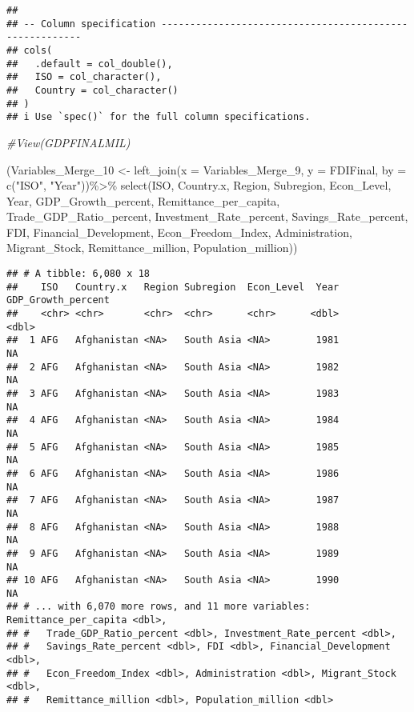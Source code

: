 \documentclass[
]{article}
\newenvironment{Shaded}{\begin{snugshade}}{\end{snugshade}}
\newcommand{\AttributeTok}[1]{\textcolor[rgb]{0.77,0.63,0.00}{#1}}
\newcommand{\CommentTok}[1]{\textcolor[rgb]{0.56,0.35,0.01}{\textit{#1}}}
\newcommand{\FunctionTok}[1]{\textcolor[rgb]{0.00,0.00,0.00}{#1}}
\newcommand{\NormalTok}[1]{#1}
\newcommand{\OtherTok}[1]{\textcolor[rgb]{0.56,0.35,0.01}{#1}}
\newcommand{\SpecialCharTok}[1]{\textcolor[rgb]{0.00,0.00,0.00}{#1}}
\newcommand{\StringTok}[1]{\textcolor[rgb]{0.31,0.60,0.02}{#1}}
\begin{document}
\begin{verbatim}
## 
## -- Column specification --------------------------------------------------------
## cols(
##   .default = col_double(),
##   ISO = col_character(),
##   Country = col_character()
## )
## i Use `spec()` for the full column specifications.
\end{verbatim}

\begin{Shaded}
\begin{Highlighting}[]
\CommentTok{\#View(GDPFINALMIL)}

\NormalTok{(Variables\_Merge\_10 }\OtherTok{\textless{}{-}} \FunctionTok{left\_join}\NormalTok{(}\AttributeTok{x =}\NormalTok{ Variables\_Merge\_9, }\AttributeTok{y =}\NormalTok{ FDIFinal, }\AttributeTok{by =} \FunctionTok{c}\NormalTok{(}\StringTok{"ISO"}\NormalTok{, }\StringTok{"Year"}\NormalTok{))}\SpecialCharTok{\%\textgreater{}\%}
  \FunctionTok{select}\NormalTok{(ISO, Country.x, Region, Subregion, Econ\_Level, Year, GDP\_Growth\_percent, Remittance\_per\_capita, Trade\_GDP\_Ratio\_percent, Investment\_Rate\_percent, Savings\_Rate\_percent, FDI, Financial\_Development, Econ\_Freedom\_Index, Administration, Migrant\_Stock, Remittance\_million, Population\_million))}
\end{Highlighting}
\end{Shaded}

\begin{verbatim}
## # A tibble: 6,080 x 18
##    ISO   Country.x   Region Subregion  Econ_Level  Year GDP_Growth_percent
##    <chr> <chr>       <chr>  <chr>      <chr>      <dbl>              <dbl>
##  1 AFG   Afghanistan <NA>   South Asia <NA>        1981                 NA
##  2 AFG   Afghanistan <NA>   South Asia <NA>        1982                 NA
##  3 AFG   Afghanistan <NA>   South Asia <NA>        1983                 NA
##  4 AFG   Afghanistan <NA>   South Asia <NA>        1984                 NA
##  5 AFG   Afghanistan <NA>   South Asia <NA>        1985                 NA
##  6 AFG   Afghanistan <NA>   South Asia <NA>        1986                 NA
##  7 AFG   Afghanistan <NA>   South Asia <NA>        1987                 NA
##  8 AFG   Afghanistan <NA>   South Asia <NA>        1988                 NA
##  9 AFG   Afghanistan <NA>   South Asia <NA>        1989                 NA
## 10 AFG   Afghanistan <NA>   South Asia <NA>        1990                 NA
## # ... with 6,070 more rows, and 11 more variables: Remittance_per_capita <dbl>,
## #   Trade_GDP_Ratio_percent <dbl>, Investment_Rate_percent <dbl>,
## #   Savings_Rate_percent <dbl>, FDI <dbl>, Financial_Development <dbl>,
## #   Econ_Freedom_Index <dbl>, Administration <dbl>, Migrant_Stock <dbl>,
## #   Remittance_million <dbl>, Population_million <dbl>
\end{verbatim}
\end{document}

